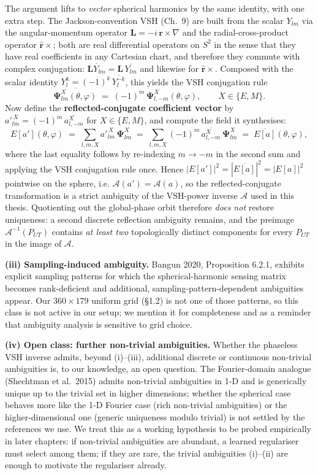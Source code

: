 \documentclass[11pt,a4paper]{report}
\begin{document}
The argument lifts to \emph{vector} spherical harmonics by the same identity, with
one extra step. The Jackson-convention VSH (Ch.~9) are built from the scalar
$Y_{lm}$ via the angular-momentum operator $\mathbf L = -i\,\mathbf r \times \nabla$
and the radial-cross-product operator $\hat{\mathbf r}\times$; both are real
differential operators on $S^2$ in the sense that they have real coefficients in
any Cartesian chart, and therefore they commute with complex conjugation:
$\overline{\mathbf L Y_{lm}} = \mathbf L\,\overline{Y_{lm}}$ and likewise for
$\hat{\mathbf r}\times$. Composed with the scalar identity
$Y_l^k = (-1)^k\,\overline{Y_l^{-k}}$, this yields the VSH conjugation rule
\[
\overline{\boldsymbol{\Psi}^X_{lm}(\theta,\varphi)} \;=\; (-1)^m\,\boldsymbol{\Psi}^X_{l,-m}(\theta,\varphi),
\qquad X\in\{E,M\}.
\]
Now define the \textbf{reflected-conjugate coefficient vector} by
$a'^{\,X}_{lm} = (-1)^m\,\overline{a^X_{l,-m}}$ for $X \in \{E, M\}$, and compute
the field it synthesises:
\[
E[a'](\theta,\varphi) \;=\; \sum_{l,m,X} a'^{\,X}_{lm}\,\boldsymbol\Psi^X_{lm}
\;=\; \sum_{l,m,X} (-1)^m\,\overline{a^X_{l,-m}}\,\boldsymbol\Psi^X_{lm}
\;=\; \overline{E[a]}(\theta,\varphi),
\]
where the last equality follows by re-indexing $m \to -m$ in the second sum and
applying the VSH conjugation rule once. Hence
$|E[a']|^2 = |\overline{E[a]}|^2 = |E[a]|^2$ pointwise on the sphere, i.e.
$\mathcal A(a') = \mathcal A(a)$, so the reflected-conjugate transformation is a
strict ambiguity of the VSH-power inverse $\mathcal A$ used in this thesis.
Quotienting out the global-phase orbit therefore \emph{does not} restore uniqueness:
a second discrete reflection ambiguity remains, and the preimage
$\mathcal{A}^{-1}(P_{UT})$ contains \emph{at least two} topologically distinct
components for every $P_{UT}$ in the image of $\mathcal{A}$.

\textbf{(iii) Sampling-induced ambiguity.} Bangun 2020, Proposition 6.2.1, exhibits
explicit sampling patterns for which the spherical-harmonic sensing matrix becomes
rank-deficient and additional, sampling-pattern-dependent ambiguities appear. Our
$360\times 179$ uniform grid (\S1.2) is not one of those patterns, so this class is
not active in our setup; we mention it for completeness and as a reminder that
ambiguity analysis is sensitive to grid choice.

\textbf{(iv) Open class: further non-trivial ambiguities.} Whether the phaseless
VSH inverse admits, beyond (i)--(iii), additional discrete or continuous non-trivial
ambiguities is, to our knowledge, an open question. The Fourier-domain analogue
(Shechtman et al.~2015) admits non-trivial ambiguities in 1-D and is generically
unique up to the trivial set in higher dimensions; whether the spherical case
behaves more like the 1-D Fourier case (rich non-trivial ambiguities) or the
higher-dimensional one (generic uniqueness modulo trivial) is not settled by the
references we use. We treat this as a working hypothesis to be probed empirically
in later chapters: if non-trivial ambiguities are abundant, a learned regulariser
must select among them; if they are rare, the trivial ambiguities (i)--(ii) are
enough to motivate the regulariser already.
\end{document}
